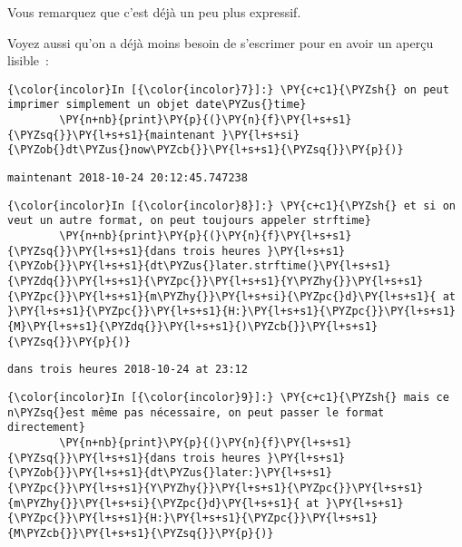     Vous remarquez que c'est déjà un peu plus expressif.

Voyez aussi qu'on a déjà moins besoin de s'escrimer pour en avoir un
aperçu lisible~:

    \begin{Verbatim}[commandchars=\\\{\}]
{\color{incolor}In [{\color{incolor}7}]:} \PY{c+c1}{\PYZsh{} on peut imprimer simplement un objet date\PYZus{}time}
        \PY{n+nb}{print}\PY{p}{(}\PY{n}{f}\PY{l+s+s1}{\PYZsq{}}\PY{l+s+s1}{maintenant }\PY{l+s+si}{\PYZob{}dt\PYZus{}now\PYZcb{}}\PY{l+s+s1}{\PYZsq{}}\PY{p}{)}
\end{Verbatim}


    \begin{Verbatim}[commandchars=\\\{\}]
maintenant 2018-10-24 20:12:45.747238

    \end{Verbatim}

    \begin{Verbatim}[commandchars=\\\{\}]
{\color{incolor}In [{\color{incolor}8}]:} \PY{c+c1}{\PYZsh{} et si on veut un autre format, on peut toujours appeler strftime}
        \PY{n+nb}{print}\PY{p}{(}\PY{n}{f}\PY{l+s+s1}{\PYZsq{}}\PY{l+s+s1}{dans trois heures }\PY{l+s+s1}{\PYZob{}}\PY{l+s+s1}{dt\PYZus{}later.strftime(}\PY{l+s+s1}{\PYZdq{}}\PY{l+s+s1}{\PYZpc{}}\PY{l+s+s1}{Y\PYZhy{}}\PY{l+s+s1}{\PYZpc{}}\PY{l+s+s1}{m\PYZhy{}}\PY{l+s+si}{\PYZpc{}d}\PY{l+s+s1}{ at }\PY{l+s+s1}{\PYZpc{}}\PY{l+s+s1}{H:}\PY{l+s+s1}{\PYZpc{}}\PY{l+s+s1}{M}\PY{l+s+s1}{\PYZdq{}}\PY{l+s+s1}{)\PYZcb{}}\PY{l+s+s1}{\PYZsq{}}\PY{p}{)}
\end{Verbatim}


    \begin{Verbatim}[commandchars=\\\{\}]
dans trois heures 2018-10-24 at 23:12

    \end{Verbatim}

    \begin{Verbatim}[commandchars=\\\{\}]
{\color{incolor}In [{\color{incolor}9}]:} \PY{c+c1}{\PYZsh{} mais ce n\PYZsq{}est même pas nécessaire, on peut passer le format directement}
        \PY{n+nb}{print}\PY{p}{(}\PY{n}{f}\PY{l+s+s1}{\PYZsq{}}\PY{l+s+s1}{dans trois heures }\PY{l+s+s1}{\PYZob{}}\PY{l+s+s1}{dt\PYZus{}later:}\PY{l+s+s1}{\PYZpc{}}\PY{l+s+s1}{Y\PYZhy{}}\PY{l+s+s1}{\PYZpc{}}\PY{l+s+s1}{m\PYZhy{}}\PY{l+s+si}{\PYZpc{}d}\PY{l+s+s1}{ at }\PY{l+s+s1}{\PYZpc{}}\PY{l+s+s1}{H:}\PY{l+s+s1}{\PYZpc{}}\PY{l+s+s1}{M\PYZcb{}}\PY{l+s+s1}{\PYZsq{}}\PY{p}{)}
\end{Verbatim}


